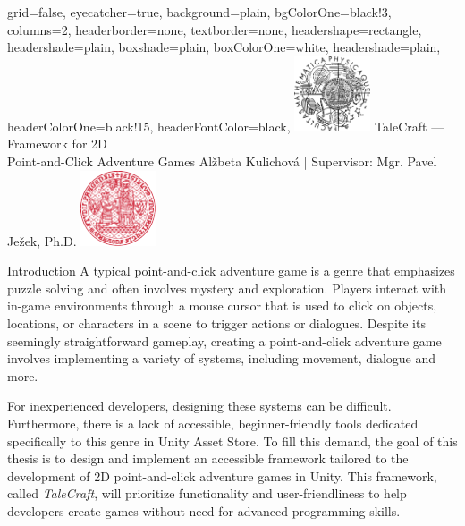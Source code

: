 \documentclass[portrait,a0paper,fontscale=0.34]{baposter}
\begin{document}
\color{black!80} %
\begin{poster}{grid=false,
	eyecatcher=true,
	background=plain,
	bgColorOne=black!3, %
	columns=2,
	headerborder=none,
	textborder=none,
	headershape=rectangle,
	headershade=plain,
	boxshade=plain,
	boxColorOne=white,
	headershade=plain,
	headerColorOne=black!15, %
	headerFontColor=black,
	}%
	{\includegraphics[height=6em]{logos/mff-black.pdf}}
	{TaleCraft — Framework for 2D\\ Point-and-Click Adventure Games}
	{\vspace{1ex} Alžbeta Kulichová | Supervisor: Mgr. Pavel Ježek, Ph.D.}
	{\includegraphics[height=6em]{logos/uk-red.pdf}}


%
%

\begin{posterbox}[column=0, span=1, name=background]{Introduction}
A typical point-and-click adventure game is a genre that emphasizes puzzle solving and often involves mystery and exploration. Players interact with in-game environments through a mouse cursor that is used to click on objects, locations, or characters in a scene to trigger actions or dialogues. Despite its seemingly straightforward gameplay, creating a point-and-click adventure game involves implementing a variety of systems, including movement, dialogue and more. 

For inexperienced developers, designing these systems can be difficult. Furthermore, there is a lack of accessible, beginner-friendly tools dedicated specifically to this genre in Unity Asset Store. To fill this demand, the goal of this thesis is to design and implement an accessible framework tailored to the development of 2D point-and-click adventure games in Unity. This framework, called \textit{TaleCraft}, will prioritize functionality and user-friendliness to help developers create games without need for advanced programming skills.
\end{posterbox}


\end{poster}
\end{document}
